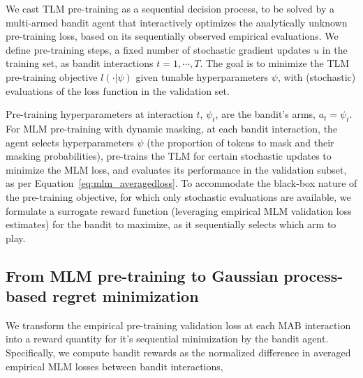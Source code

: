 We cast TLM pre-training as a sequential decision process,
to be solved by a multi-armed bandit agent
that interactively optimizes the analytically unknown pre-training loss, 
based on its sequentially observed empirical evaluations.
We define pre-training steps,
\ie a fixed number of stochastic gradient updates $u$ in the training set,
as bandit interactions $t=1,\cdots,T$.
The goal is to minimize the TLM pre-training objective $l(\cdot |\psi)$ given tunable hyperparameters $\psi$,
with (stochastic) evaluations of the loss function in the validation set.

Pre-training hyperparameters at interaction $t$, $\psi_t$, are the bandit's arms, \ie $a_t=\psi_t$.
%
For MLM pre-training with dynamic masking,
at each bandit interaction,
the agent selects hyperparameters $\psi$ (the proportion of tokens to mask and their masking probabilities),
pre-trains the TLM for certain stochastic updates to minimize the MLM loss, %
and evaluates its performance in the validation subset,
as per Equation~\eqref{eq:mlm_averagedloss}.
%
To accommodate the black-box nature of the pre-training objective, for which only stochastic evaluations are available,
we formulate a surrogate reward function (leveraging empirical MLM validation loss estimates)
for the bandit to maximize, as it sequentially selects which arm to play.

\subsection{From MLM pre-training to Gaussian process-based regret minimization}
\label{ssec:method_rewards}
We transform the empirical pre-training validation loss at each MAB interaction
into a reward quantity for it's sequential minimization by the bandit agent.
Specifically, we compute bandit rewards as the normalized difference in averaged empirical MLM losses between bandit interactions, \ie

